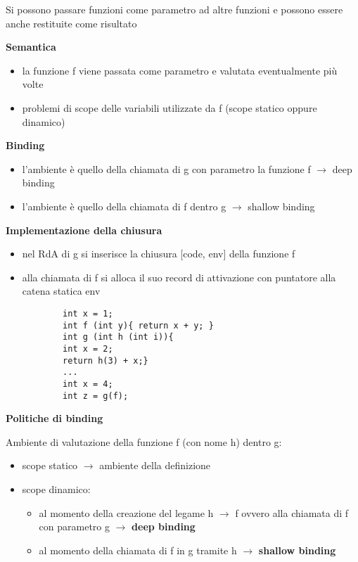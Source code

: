 \documentclass[12pt]{extarticle}
\begin{document}
\begin{flushleft}

Si possono passare funzioni come parametro ad altre funzioni e possono essere anche restituite come risultato

\medskip

\textbf{Semantica}
\begin{itemize}
    \item la funzione f viene passata come parametro e valutata eventualmente più volte
    \item problemi di scope delle variabili utilizzate da f (scope statico oppure dinamico)
\end{itemize}

\medskip

\textbf{Binding}
\begin{itemize}
    \item l'ambiente è quello della chiamata di g con parametro la funzione f $\rightarrow$ deep binding
    \item l'ambiente è quello della chiamata di f dentro g $\rightarrow$ shallow binding
\end{itemize}

\textbf{Implementazione della chiusura}
\begin{itemize}
    \item nel RdA di g si inserisce la chiusura [code, env] della funzione f
    \item alla chiamata di f si alloca il suo record di attivazione con puntatore alla catena statica env
    \begin{lstlisting}
        int x = 1;
        int f (int y){ return x + y; }
        int g (int h (int i)){
        int x = 2;
        return h(3) + x;}
        ...
        int x = 4;
        int z = g(f);
    \end{lstlisting}
\end{itemize}

\medskip

\textbf{Politiche di binding}

Ambiente di valutazione della funzione f (con nome h) dentro g:
\begin{itemize}
    \item scope statico $\rightarrow$ ambiente della definizione
    \item scope dinamico: \begin{itemize}
        \item al momento della creazione del legame h $\rightarrow$ f ovvero alla chiamata di f con parametro g
              $\rightarrow$ \textbf{deep binding}
        \item al momento della chiamata di f in g tramite h $\rightarrow$ \textbf{shallow binding}
    \end{itemize}
\end{itemize}


\end{flushleft}
\end{document}
